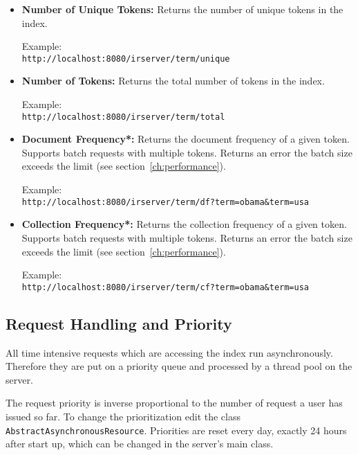 \documentclass[a4paper,11pt]{article}
\begin{document}
\begin{itemize}

\item \textbf{Number of Unique Tokens:} Returns the number of unique tokens in the index.
\begin{leftbar}
Example:\\
\texttt{http://localhost:8080/irserver/term/unique}
\end{leftbar}

\item \textbf{Number of Tokens:} Returns the total number of tokens in the index.
\begin{leftbar}
Example:\\
\texttt{http://localhost:8080/irserver/term/total}
\end{leftbar}

\item \textbf{Document Frequency*:} Returns the document frequency of a given token. Supports batch requests with multiple tokens. Returns an error the batch size exceeds the limit (see section~\ref{ch:performance}).
\begin{leftbar}
Example:\\
\texttt{http://localhost:8080/irserver/term/df?term=obama\&term=usa}
\end{leftbar}

\item \textbf{Collection Frequency*:} Returns the collection frequency of a given token. Supports batch requests with multiple tokens. Returns an error the batch size exceeds the limit (see section~\ref{ch:performance}).
\begin{leftbar}
Example:\\
\texttt{http://localhost:8080/irserver/term/cf?term=obama\&term=usa}
\end{leftbar}

\end{itemize}

\subsection{Request Handling and Priority}
\label{ch:upriority}
All time intensive requests which are accessing the index run asynchronously. Therefore they are put on a priority queue and processed by a thread pool on the server. 

The request priority is inverse proportional to the number of request a user has issued so far. To change the prioritization edit the class \texttt{AbstractAsynchronousResource}. Priorities are reset every day, exactly 24 hours after start up, which can be changed in the server's main class.
\end{document}
